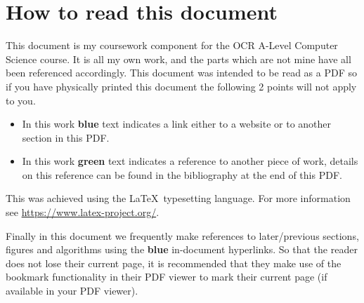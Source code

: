 \pagestyle{fancy}
\chead{\mdseries \thepage}

\section*{How to read this document}

This document is my coursework component for the OCR A-Level
Computer Science course. It is all my own work, and the parts
which are not mine have all been referenced accordingly. This 
document was intended to be read as a PDF so if you have 
physically printed this document the following
2 points will not apply to you.\\ \vspace{0.2cm}

\begin{itemize}

\item{
In this work { \color{blue} \textbf{blue} } text indicates a
link either to a website or to another section in this PDF. \\
\vspace{0.2cm}
}

\item{
In this work { \color{green} \textbf{green} } text indicates a
reference to another piece of work, details on this reference
can be found in the bibliography at the end of this PDF.\\
\vspace{0.2cm}
}

\end{itemize}

This was achieved using the \LaTeX \ typesetting language.
For more information see \url{https://www.latex-project.org/}.
\\ \vspace{0.2cm}

Finally in this document we frequently make references to
later/previous sections, figures and algorithms using the
{ \color{blue} \textbf{blue} } in-document hyperlinks. So
that the reader does not lose their current page, it 
is recommended that they make use of the bookmark functionality 
in their PDF viewer to mark their current page 
(if available in your PDF viewer). \\ \vspace{0.2cm}

